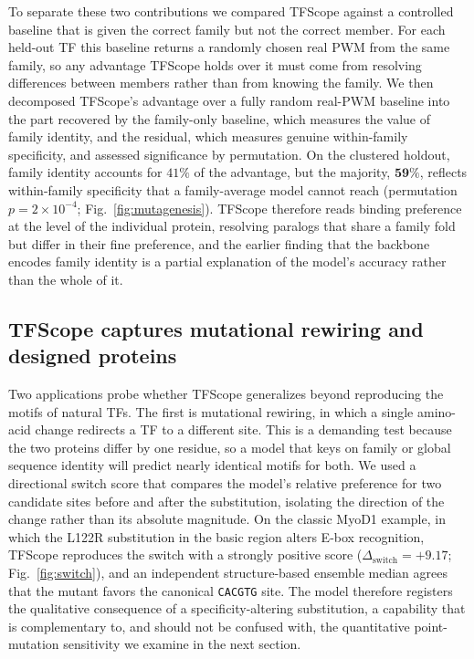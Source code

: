 \documentclass[11pt]{article}
\begin{document}
To separate these two contributions we compared TFScope against a controlled baseline
that is given the correct family but not the correct member. For each held-out TF this
baseline returns a randomly chosen real PWM from the same family, so any advantage
TFScope holds over it must come from resolving differences between members rather than
from knowing the family. We then decomposed TFScope's advantage over a fully random
real-PWM baseline into the part recovered by the family-only baseline, which measures
the value of family identity, and the residual, which measures genuine within-family
specificity, and assessed significance by permutation. On the clustered holdout,
family identity accounts for $41\%$ of the advantage, but the majority, $\mathbf{59\%}$,
reflects within-family specificity that a family-average model cannot reach
(permutation $p=2\times10^{-4}$; Fig.~\ref{fig:mutagenesis}). TFScope therefore reads
binding preference at the level of the individual protein, resolving paralogs that
share a family fold but differ in their fine preference, and the earlier finding that
the backbone encodes family identity is a partial explanation of the model's accuracy
rather than the whole of it.

\subsection*{TFScope captures mutational rewiring and designed proteins}

Two applications probe whether TFScope generalizes beyond reproducing the motifs of
natural TFs. The first is mutational rewiring, in which a single amino-acid change
redirects a TF to a different site. This is a demanding test because the two proteins
differ by one residue, so a model that keys on family or global sequence identity will
predict nearly identical motifs for both. We used a directional switch score that
compares the model's relative preference for two candidate sites before and after the
substitution, isolating the direction of the change rather than its absolute
magnitude. On the classic MyoD1 example, in which the L122R substitution in the basic
region alters E-box recognition, TFScope reproduces the switch with a strongly
positive score ($\Delta_{\mathrm{switch}} = +9.17$; Fig.~\ref{fig:switch}), and an
independent structure-based ensemble median agrees that the mutant favors the
canonical \texttt{CACGTG} site. The model therefore registers the qualitative
consequence of a specificity-altering substitution, a capability that is
complementary to, and should not be confused with, the quantitative
point-mutation sensitivity we examine in the next section.
\end{document}
